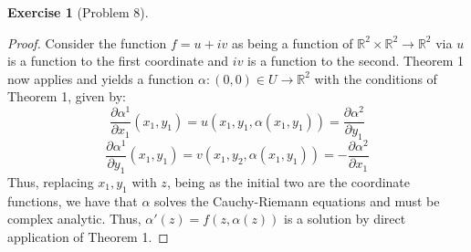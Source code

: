\documentclass{article}
\newtheorem{exercise}{Exercise}
\begin{document}
\begin{exercise}[Problem 8]
\end{exercise}

\begin{proof}
  Consider the function $f = u + iv$ as being a function of $\mathbb{R}^{2}\times \mathbb{R}^{2} \to \mathbb{R}^{2}$ via $u$ is a function to the first coordinate and $iv$ is a function to the second. Theorem 1 now applies and yields a function $\alpha: (0,0) \in U \to \mathbb{R}^{2}$ with the conditions of Theorem 1, given by:
  \[
    \frac{\partial\alpha^{1}}{\partial x_{1}}(x_{1},y_{1}) = u(x_{1},y_{1}, \alpha(x_{1},y_{1})) = \frac{\partial \alpha^{2}}{\partial y_{1}} 
  \]
  \[
    \frac{\partial \alpha^{1}}{\partial y_{1}}(x_{1},y_{1}) = v(x_{1},y_{2}, \alpha(x_{1},y_{1})) = - \frac{\partial \alpha^{2}}{\partial x_{1}} 
  \]
  Thus, replacing $x_{1},y_{1}$ with $z$, being as the initial two are the coordinate functions, we have that $\alpha$ solves the Cauchy-Riemann equations and must be complex analytic. Thus, $\alpha'(z) = f(z, \alpha(z))$ is a solution by direct application of Theorem 1. 
\end{proof}
\end{document}

